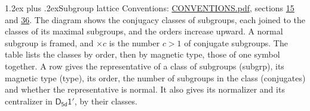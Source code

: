 \documentclass[10pt,a4paper]{article}
\makeatletter
\renewcommand\section{\@startsection{section}{1}{\z@}{-3ex plus -1ex minus -.2ex}%
  {1.2ex plus .2ex}{\normalfont\large\sffamily\bfseries\color{parttitle}}}
\numberwithin{equation}{section}
\newcommand{\grp}[1]{\mathsf{#1}}
\makeatother
\begin{document}
\section{Subgroup lattice}\label{s:subgroups}
Conventions: \href{../../CONVENTIONS.pdf}{CONVENTIONS.pdf}, sections \href{../../../rotation/CONVENTIONS.pdf\#conv.15}{15} and \href{../../CONVENTIONS.pdf\#conv.36}{36}.
The diagram shows the conjugacy classes of subgroups, each joined to the classes of its maximal subgroups, and the orders increase upward. \label{n:index.conjugates.c}\label{n:mark.conjugates}A normal subgroup is framed, and ${\times}c$ is the number $c > 1$ of conjugate subgroups. The table lists the classes by order, then by magnetic type, those of one symbol together. \label{n:head.subgroup}\label{n:head.magnetic.type}\label{n:head.order}\label{n:head.conjugates}\label{n:head.normal}A row gives the representative of a class of subgroups (subgrp), its magnetic type (type), its order, the number of subgroups in the class (conjugates) and whether the representative is normal. \label{n:head.normalizer}\label{n:head.centralizer}It also gives its normalizer and its centralizer in $\grp{D_{5d}1'}$, by their classes. 
\end{document}
